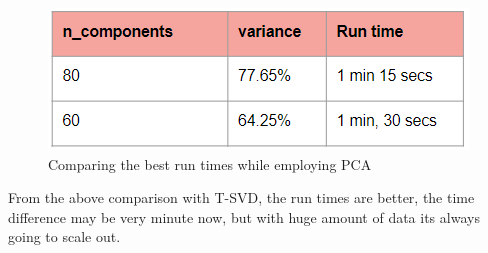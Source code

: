 \documentclass[journal,transmag]{J-NaNA}
\begin{document}
\begin{figure}[htbp]
\centering
\includegraphics[width=\linewidth]{pca-table-chchse.PNG} 
\caption{Comparing the best run times while employing PCA} 
\label{fig: PCA variance and time} %
\end{figure}
From the above comparison with T-SVD, the run times are better, the time difference may be very minute now, but with huge amount of data its always going to scale out. 
\end{document}
